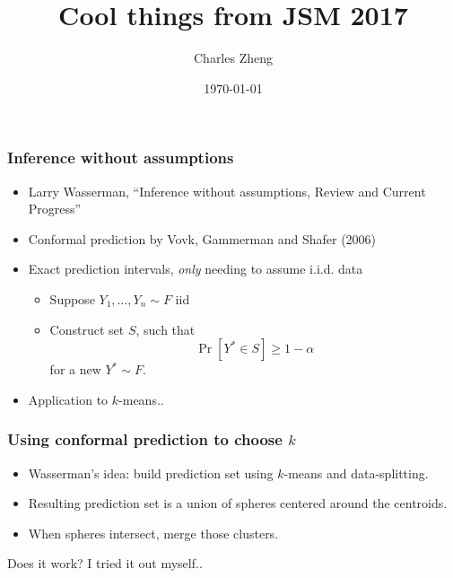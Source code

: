 \documentclass{beamer}
\title[JSM 2017]{Cool things from JSM 2017}
\author{Charles Zheng} %
\institute[NIMH] %
{National Institute of Mental Health}
\date{\today} %
\begin{document}
\begin{frame}
\titlepage %
\end{frame}

\begin{frame}
\frametitle{Inference without assumptions}
\begin{itemize}
\item Larry Wasserman, ``Inference without assumptions, Review and Current Progress''
\item Conformal prediction by Vovk, Gammerman and Shafer (2006)
\item Exact prediction intervals, \emph{only} needing to assume i.i.d. data
\begin{itemize}
\item Suppose $Y_1,\hdots, Y_n \sim F$ iid
\item Construct set $S$, such that
\[
\Pr[Y^* \in S] \geq 1 -\alpha
\]
for a new $Y^* \sim F$.
\end{itemize}
\item Application to $k$-means..
\end{itemize}
\end{frame}

\begin{frame}
\frametitle{Using conformal prediction to choose $k$}
\begin{itemize}
\item Wasserman's idea: build prediction set using $k$-means and data-splitting. 
\item Resulting prediction set is a union of spheres centered around the centroids.
\item When spheres intersect, merge those clusters.
\end{itemize}
Does it work?  I tried it out myself..
\end{frame}
\end{document}
